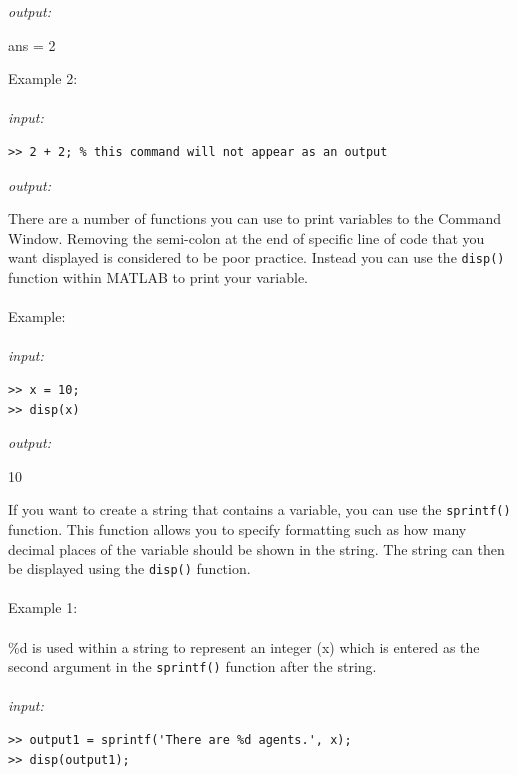 \documentclass[../MATLAB_Primer.tex]{subfiles}
\begin{document}
\textit{output:}

\begin{center}
    ans = 2
\end{center}

Example 2:
\\ \\
\textit{input:}
\begin{lstlisting}[frame=single]
>> 2 + 2; % this command will not appear as an output
\end{lstlisting}

\textit{output:}

\begin{center}
    
\end{center}

There are a number of functions you can use to print variables to the Command Window. Removing the semi-colon at the end of specific line of code that you want displayed is considered to be poor practice. Instead you can use the \texttt{disp()} function within MATLAB to print your variable.
\\ \\
Example:
\\ \\
\textit{input:}
\begin{lstlisting}[frame=single]
>> x = 10;
>> disp(x)
\end{lstlisting}

\textit{output:}

\begin{center}
    10
\end{center}

If you want to create a string that contains a variable, you can use the \texttt{sprintf()} function. This function allows you to specify formatting such as how many decimal places of the variable should be shown in the string. The string can then be displayed using the \texttt{disp()} function.
\\ \\
Example 1:
\\ \\
\%d is used within a string to represent an integer (x) which is entered as the second argument in the \texttt{sprintf()} function after the string.
\\ \\
\textit{input:}
\begin{lstlisting}[frame=single]
>> output1 = sprintf('There are %d agents.', x); 
>> disp(output1);
\end{lstlisting}
\end{document}
